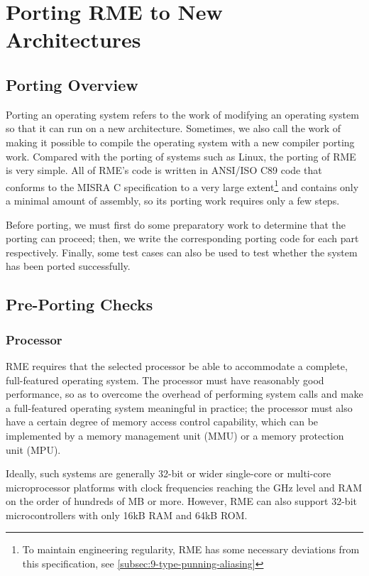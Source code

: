 \chapter{Porting RME to New Architectures}\label{ch:porting-rme-to-new-architecture}

\section{Porting Overview}\label{sec:7-porting-overview}

Porting an operating system refers to the work of modifying an operating system so that it can run on a new architecture. Sometimes, we also call the work of making it possible to compile the operating system with a new compiler porting work. Compared with the porting of systems such as Linux, the porting of RME is very simple. All of RME's code is written in ANSI/ISO C89 code that conforms to the MISRA C specification to a very large extent\footnote{To maintain engineering regularity, RME has some necessary deviations from this specification, see \ref{subsec:9-type-punning-aliasing}} and contains only a minimal amount of assembly, so its porting work requires only a few steps.

Before porting, we must first do some preparatory work to determine that the porting can proceed; then, we write the corresponding porting code for each part respectively. Finally, some test cases can also be used to test whether the system has been ported successfully.

\section{Pre-Porting Checks}\label{sec:7-pre-porting-checks}

\subsection{Processor}\label{subsec:7-processor}

RME requires that the selected processor be able to accommodate a complete, full-featured operating system. The processor must have reasonably good performance, so as to overcome the overhead of performing system calls and make a full-featured operating system meaningful in practice; the processor must also have a certain degree of memory access control capability, which can be implemented by a memory management unit (MMU) or a memory protection unit (MPU).

Ideally, such systems are generally 32-bit or wider single-core or multi-core microprocessor platforms with clock frequencies reaching the GHz level and RAM on the order of hundreds of MB or more. However, RME can also support 32-bit microcontrollers with only 16kB
RAM and 64kB ROM.

